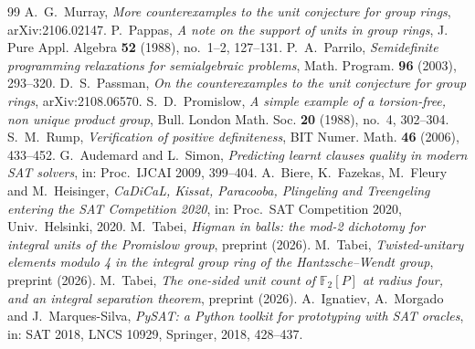 \documentclass[10pt,a4paper]{amsart}
\begin{document}
\begin{thebibliography}{99}
 A.~G.~Murray, \emph{More counterexamples to the unit conjecture for group rings}, arXiv:2106.02147.
 P.~Pappas, \emph{A note on the support of units in group rings}, J. Pure Appl. Algebra \textbf{52} (1988), no.~1--2, 127--131.
 P.~A.~Parrilo, \emph{Semidefinite programming relaxations for semialgebraic problems}, Math. Program. \textbf{96} (2003), 293--320.
 D.~S.~Passman, \emph{On the counterexamples to the unit conjecture for group rings}, arXiv:2108.06570.
 S.~D.~Promislow, \emph{A simple example of a torsion-free, non unique product group}, Bull. London Math. Soc. \textbf{20} (1988), no.~4, 302--304.
 S.~M.~Rump, \emph{Verification of positive definiteness}, BIT Numer. Math. \textbf{46} (2006), 433--452.
 G.~Audemard and L.~Simon, \emph{Predicting learnt clauses quality in modern SAT solvers}, in: Proc.\ IJCAI 2009, 399--404.
 A.~Biere, K.~Fazekas, M.~Fleury and M.~Heisinger, \emph{CaDiCaL, Kissat, Paracooba, Plingeling and Treengeling entering the SAT Competition 2020}, in: Proc.\ SAT Competition 2020, Univ.\ Helsinki, 2020.
 M.~Tabei, \emph{Higman in balls: the mod-2 dichotomy for integral units of the Promislow group}, preprint (2026).
 M.~Tabei, \emph{Twisted-unitary elements modulo 4 in the integral group ring of the Hantzsche--Wendt group}, preprint (2026).
 M.~Tabei, \emph{The one-sided unit count of $\mathbb{F}_2[P]$ at radius four, and an integral separation theorem}, preprint (2026).
 A.~Ignatiev, A.~Morgado and J.~Marques-Silva, \emph{PySAT: a Python toolkit for prototyping with SAT oracles}, in: SAT 2018, LNCS 10929, Springer, 2018, 428--437.
\end{thebibliography}
\end{document}
